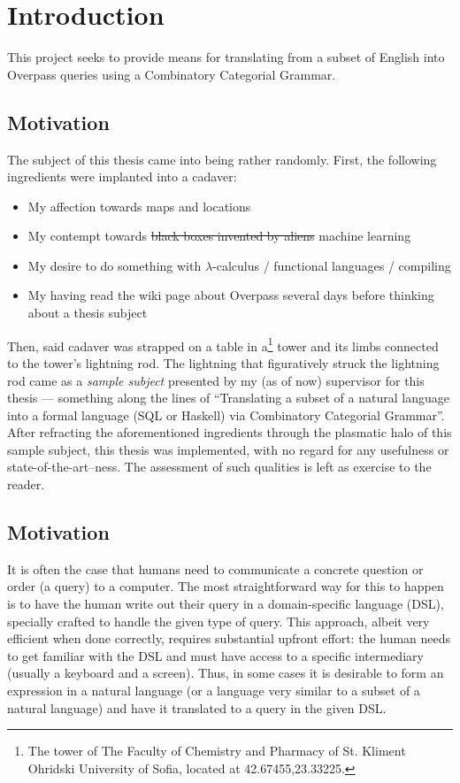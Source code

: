 \documentclass[main.tex]{subfiles}
\begin{document}
\section{Introduction}
This project seeks to provide means for translating from a subset of English
into Overpass queries using a Combinatory Categorial Grammar.

\subsection{\selectfont Motivation}
The subject of this thesis came into being rather randomly.
First, the following ingredients were implanted into a cadaver:
\begin{itemize}
    \item My affection towards maps and locations
    \item My contempt towards \sout{black boxes invented by aliens}
        machine learning
    \item My desire to do something with $\lambda$-calculus / functional
        languages / compiling
    \item My having read the wiki page about Overpass several days before
        thinking about a thesis subject
\end{itemize}
Then, said cadaver was strapped on a table in a\footnote{The tower of
The Faculty of Chemistry and Pharmacy of St. Kliment Ohridski University
of Sofia, located at 42.67455,23.33225.} tower and its limbs connected
to the tower's lightning rod. The lightning that figuratively struck the
lightning rod came as a \emph{sample subject} presented by my (as of now)
supervisor for this thesis --- something along the lines of ``Translating
a subset of a natural language into a formal language (SQL or Haskell)
via Combinatory Categorial Grammar''. After refracting the aforementioned
ingredients through the plasmatic halo of this sample subject, this thesis
was implemented, with no regard for any usefulness or state-of-the-art--ness.
The assessment of such qualities is left as exercise to the reader.

\subsection{Motivation}
It is often the case that humans need to communicate a concrete question
or order (a query) to a computer. The most straightforward way for this to happen is
to have the human write out their query in a domain-specific language (DSL),
specially crafted to handle the given type of query. This approach, albeit
very efficient when done correctly, requires substantial upfront effort:
the human needs to get familiar with the DSL and must have access to a specific
intermediary
(usually a keyboard and a screen). Thus, in some cases it is desirable
to form an expression in a natural language (or a language very similar to a
subset of a natural language) and have it translated to a query in the given
DSL.
\end{document}
